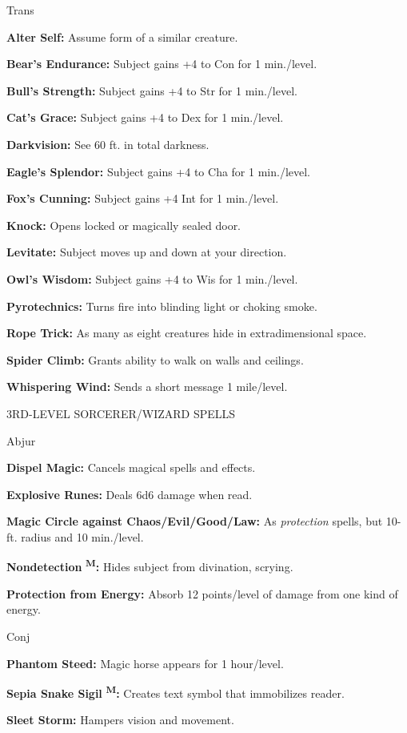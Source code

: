 \documentclass{article}
\begin{document}
Trans

\textbf{Alter Self:} Assume form of a similar creature.

\textbf{Bear's Endurance:} Subject gains +4 to Con for 1 min./level.

\textbf{Bull's Strength:} Subject gains +4 to Str for 1 min./level.

\textbf{Cat's Grace:} Subject gains +4 to Dex for 1 min./level.

\textbf{Darkvision:} See 60 ft. in total darkness.

\textbf{Eagle's Splendor:} Subject gains +4 to Cha for 1 min./level.

\textbf{Fox's Cunning:} Subject gains +4 Int for 1 min./level.

\textbf{Knock:} Opens locked or magically sealed door.

\textbf{Levitate:} Subject moves up and down at your direction.

\textbf{Owl's Wisdom:} Subject gains +4 to Wis for 1 min./level.

\textbf{Pyrotechnics:} Turns fire into blinding light or choking smoke.

\textbf{Rope Trick:} As many as eight creatures hide in extradimensional space.

\textbf{Spider Climb:} Grants ability to walk on walls and ceilings.

\textbf{Whispering Wind:} Sends a short message 1 mile/level.

3RD-LEVEL SORCERER/WIZARD SPELLS

Abjur

\textbf{Dispel Magic:} Cancels magical spells and effects.

\textbf{Explosive Runes:} Deals 6d6 damage when read.

\textbf{Magic Circle against Chaos/Evil/Good/Law:} As \textit{protection }spells, 
but 10-ft. radius and 10 min./level.

\textbf{Nondetection }\textsuperscript{\textbf{M}}\textbf{:} Hides subject from 
divination, scrying.

\textbf{Protection from Energy:} Absorb 12 points/level of damage from one kind 
of energy.

Conj

\textbf{Phantom Steed:} Magic horse appears for 1 hour/level.

\textbf{Sepia Snake Sigil }\textsuperscript{\textbf{M}}\textbf{:} Creates text 
symbol that immobilizes reader.

\textbf{Sleet Storm:} Hampers vision and movement.
\end{document}
